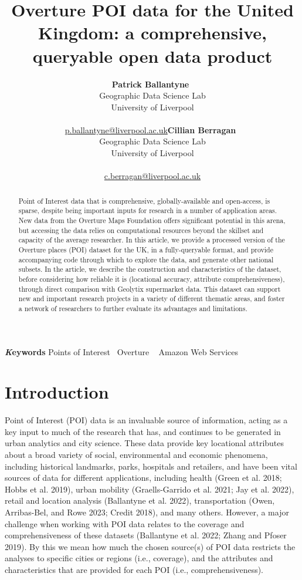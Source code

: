 \documentclass[
]{article}
\title{Overture POI data for the United Kingdom: a comprehensive,
queryable open data product}
\author{\textbf{Patrick
Ballantyne}~\orcidlink{0000-0001-8980-2912}\\Geographic Data Science
Lab\\University of
Liverpool\\\\\href{mailto:p.ballantyne@liverpool.ac.uk}{p.ballantyne@liverpool.ac.uk}\asep\textbf{Cillian
Berragan}~\orcidlink{0000-0003-2198-2245}\\Geographic Data Science
Lab\\University of
Liverpool\\\\\href{mailto:c.berragan@liverpool.ac.uk}{c.berragan@liverpool.ac.uk}}
\date{}
\begin{document}
\maketitle
\begin{abstract}
Point of Interest data that is comprehensive, globally-available and
open-access, is sparse, despite being important inputs for research in a
number of application areas. New data from the Overture Maps Foundation
offers significant potential in this arena, but accessing the data
relies on computational resources beyond the skillset and capacity of
the average researcher. In this article, we provide a processed version
of the Overture places (POI) dataset for the UK, in a fully-queryable
format, and provide accompanying code through which to explore the data,
and generate other national subsets. In the article, we describe the
construction and characteristics of the dataset, before considering how
reliable it is (locational accuracy, attribute comprehensiveness),
through direct comparison with Geolytix supermarket data. This dataset
can support new and important research projects in a variety of
different thematic areas, and foster a network of researchers to further
evaluate its advantages and limitations.
\end{abstract}
{\bfseries \emph Keywords}
\def\sep{\textbullet\ }
Points of Interest \sep Overture \sep 
Amazon Web Services

\section{Introduction}\label{introduction}

Point of Interest (POI) data is an invaluable source of information,
acting as a key input to much of the research that has, and continues to
be generated in urban analytics and city science. These data provide key
locational attributes about a broad variety of social, environmental and
economic phenomena, including historical landmarks, parks, hospitals and
retailers, and have been vital sources of data for different
applications, including health (Green et al. 2018; Hobbs et al. 2019),
urban mobility (Graells-Garrido et al. 2021; Jay et al. 2022), retail
and location analysis (Ballantyne et al. 2022), transportation (Owen,
Arribas-Bel, and Rowe 2023; Credit 2018), and many others. However, a
major challenge when working with POI data relates to the coverage and
comprehensiveness of these datasets (Ballantyne et al. 2022; Zhang and
Pfoser 2019). By this we mean how much the chosen source(s) of POI data
restricts the analyses to specific cities or regions (i.e., coverage),
and the attributes and characteristics that are provided for each POI
(i.e., comprehensiveness).
\end{document}
